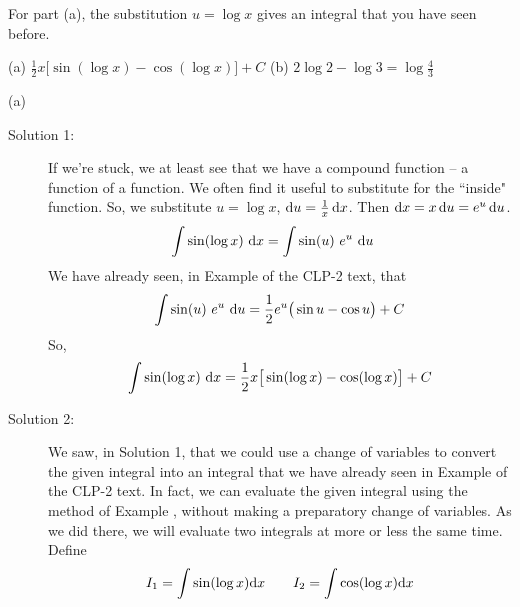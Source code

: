 \begin{hint}
For part (a), the substitution $u=\log x$ gives an integral that you
have seen before.
\end{hint}

\begin{answer} (a)
$\displaystyle \frac{1}{2} x \big[\sin(\log x) -\cos(\log x)\big]+C $
\qquad (b)
$2\log 2 -\log 3 = \log\frac{4}{3}$
\end{answer}

\begin{solution} (a) 

\begin{description}
\item[Solution 1:]
If we're stuck, we at least see that we have a compound function -- a function of a function. We often find it useful to substitute for the ``inside" function. So, we
substitute $u=\log x$, $\mathrm{d}u=\frac{1}{x}\,\mathrm{d}x$. Then
$\mathrm{d}x = x\,\mathrm{d}u= e^u\,\mathrm{d}u$.
\begin{align*}
\int\sin(\log x) \ \mathrm{d}x
&=\int\sin(u)\ e^u\ \mathrm{d}u
\end{align*}
We have already seen, in Example  of
the CLP-2 text, that
\begin{equation*}
\int\sin(u)\ e^u\ \mathrm{d}u
=\frac{1}{2}e^u\big(\sin u -\cos u\big)+C
\end{equation*}
So,
\begin{equation*}
\int\sin(\log x)\ \mathrm{d}x =\frac{1}{2} x \big[\sin(\log x) -\cos(\log x)\big]+C
\end{equation*}

\item[Solution 2:]
We saw, in Solution 1, that we could use a change of variables to convert the given integral
into an integral that we have already seen in Example  of
the CLP-2 text. In fact, we can evaluate the given integral using the method of Example , without making a preparatory change of variables. As we did there, we will evaluate
two integrals at more or less the same time. Define
\begin{align*}
I_1=\int \sin(\log x)\mathrm{d}x\qquad
I_2=\int \cos(\log x)\mathrm{d}x
\end{align*}


\end{description}
\end{solution}

